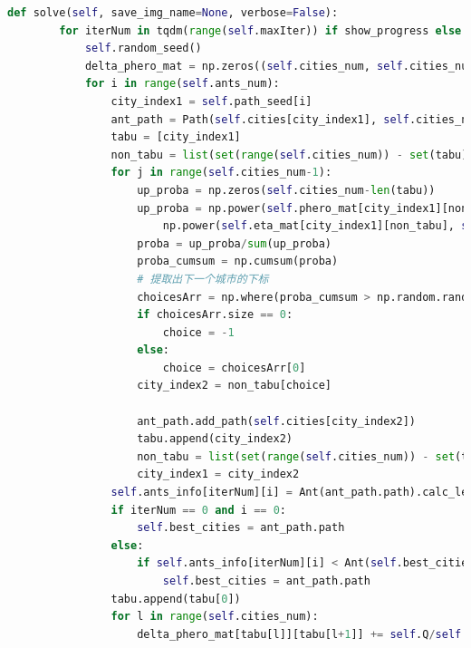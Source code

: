 \documentclass{cumcmthesis}
\begin{document}
\begin{appendices}
\begin{lstlisting}[language=Python]
    def solve(self, save_img_name=None, verbose=False):
        for iterNum in tqdm(range(self.maxIter)) if show_progress else range(self.maxIter):
            self.random_seed()                                                 # 使整个蚁群产生随机的起始点
            delta_phero_mat = np.zeros((self.cities_num, self.cities_num))     # 初始化每次迭代后信息素矩阵的增量
            for i in range(self.ants_num):
                city_index1 = self.path_seed[i]                                # 每只蚂蚁访问的第一个城市下标
                ant_path = Path(self.cities[city_index1], self.cities_num)     # 记录每只蚂蚁访问过的城市
                tabu = [city_index1]                                           # 记录每只蚂蚁访问过的城市下标，禁忌城市下标列表
                non_tabu = list(set(range(self.cities_num)) - set(tabu))
                for j in range(self.cities_num-1):                             # 对余下的城市进行访问
                    up_proba = np.zeros(self.cities_num-len(tabu))             # 初始化状态迁移概率的分子
                    up_proba = np.power(self.phero_mat[city_index1][non_tabu], self.alpha) * \
                        np.power(self.eta_mat[city_index1][non_tabu], self.beta)
                    proba = up_proba/sum(up_proba)                             # 每条可能子路径上的状态迁移概率
                    proba_cumsum = np.cumsum(proba)
                    # 提取出下一个城市的下标
                    choicesArr = np.where(proba_cumsum > np.random.rand())[0]
                    if choicesArr.size == 0:
                        choice = -1
                    else:
                        choice = choicesArr[0]
                    city_index2 = non_tabu[choice]

                    ant_path.add_path(self.cities[city_index2])
                    tabu.append(city_index2)
                    non_tabu = list(set(range(self.cities_num)) - set(tabu))
                    city_index1 = city_index2
                self.ants_info[iterNum][i] = Ant(ant_path.path).calc_length()
                if iterNum == 0 and i == 0:                                    # 完成对最佳路径城市的记录
                    self.best_cities = ant_path.path
                else:
                    if self.ants_info[iterNum][i] < Ant(self.best_cities).calc_length():
                        self.best_cities = ant_path.path
                tabu.append(tabu[0])                                           # 每次迭代完成后，使禁忌城市下标列表形成完整闭环
                for l in range(self.cities_num):
                    delta_phero_mat[tabu[l]][tabu[l+1]] += self.Q/self.ants_info[iterNum][i]


\end{lstlisting}
\end{appendices}
\end{document}
